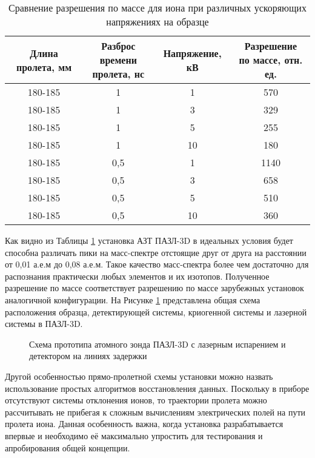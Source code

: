\begin{table} [htbp]
	\centering
	\caption{Сравнение разрешения по массе для иона при различных ускоряющих напряжениях на образце}
	\label{tab:calcFWHM}
	\begin{SingleSpace}
		\begin{tabular} {| c | c | c | c |}
			\hline
			Длина пролета, мм & \thead{Разброс времени\\ пролета, нс} & Напряжение, кВ & \thead{Разрешение \\по массе, отн. ед.}  \\ \hline
			180-185 & 1 & 1  &  570               \\ \hline
			180-185 & 1 & 3  &  329               \\ \hline
			180-185 & 1 & 5  &  255               \\ \hline
			180-185 & 1 & 10 &  180               \\ \hline
			180-185 & 0,5 & 1  &  1140               \\ \hline
			180-185 & 0,5 & 3  &  658               \\ \hline
			180-185 & 0,5 & 5  &  510               \\ \hline
			180-185 & 0,5 & 10 &  360               \\ \hline
		\end{tabular}
	\end{SingleSpace}
\end{table}

Как видно из Таблицы \cref{tab:calcFWHM} установка АЗТ ПАЗЛ-3D в идеальных условия будет способна различать пики на масс-спектре отстоящие друг от друга на расстоянии от 0,01 а.е.м до 0,08 а.е.м. Такое качество масс-спектра более чем достаточно для распознания практически любых элементов и их изотопов. Полученное разрешение по массе соответствует разрешению по массе зарубежных установок аналогичной конфигурации. На Рисунке \cref{fig:main_scheme} представлена общая схема расположения образца, детектирующей системы, криогенной системы и лазерной системы в ПАЗЛ-3D.

\begin{figure}[htb]
	\caption{Схема прототипа атомного зонда ПАЗЛ-3D с лазерным испарением и детектором на линиях задержки}
	\label{fig:main_scheme}
\end{figure}
  
Другой особенностью прямо-пролетной схемы установки можно назвать использование простых алгоритмов восстановления данных. Поскольку в приборе отсутствуют системы отклонения ионов, то траектории пролета можно рассчитывать не прибегая к сложным вычислениям электрических полей на пути пролета иона. Данная особенность важна, когда установка разрабатывается впервые и необходимо её максимально упростить для тестирования и апробирования общей концепции.

